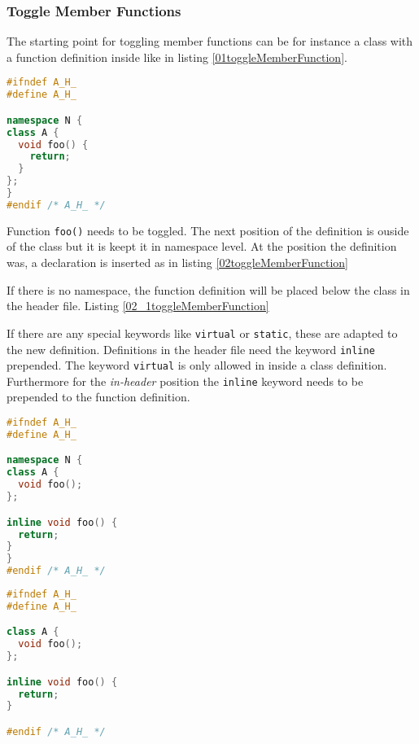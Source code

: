 \subsubsection{Toggle Member Functions}

The starting point for toggling member functions can be for instance a class
with a function definition inside like in listing
\nolinebreak\ref{01toggleMemberFunction}.

\begin{lstlisting}[caption={A.h, function definition inside class declaration},
label={01toggleMemberFunction}, language=C++]
#ifndef A_H_
#define A_H_

namespace N {
class A {
  void foo() {
    return;
  }
};
}
#endif /* A_H_ */
\end{lstlisting}

Function \texttt{foo()} needs to be toggled. The next position of the
definition is ouside of the class but it is keept it in namespace level. At the
position the definition was, a declaration is inserted as in listing
\ref{02toggleMemberFunction}

If there is no namespace, the function definition will be placed below the
class in the header file. Listing \ref{02_1toggleMemberFunction}

If there are any special keywords like \texttt{virtual} or \texttt{static},
these are adapted to the new definition. Definitions in the header file need
the keyword \texttt{inline} prepended. The keyword \texttt{virtual}
is only allowed in inside a class definition. Furthermore for the
\textit{in-header} position the \texttt{inline} keyword needs to be prepended to
the function definition.

\begin{lstlisting}[caption={A.h,
function definition outside class
definition in header}, label={02toggleMemberFunction}, language=C++]
#ifndef A_H_
#define A_H_

namespace N {
class A {
  void foo();
};

inline void foo() {
  return;
}
}
#endif /* A_H_ */
\end{lstlisting}

\begin{lstlisting}[caption={A.h,
function definition outside class definition without namespace},
label={02_1toggleMemberFunction}, language=C++]
#ifndef A_H_
#define A_H_

class A {
  void foo();
};

inline void foo() {
  return;
}

#endif /* A_H_ */
\end{lstlisting}

